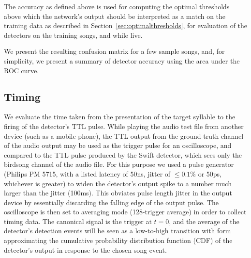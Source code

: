 \documentclass[10pt,letterpaper]{article}
\newcommand\argmin{\mathop{\mbox{{\rm argmin}}}\limits}
\newcommand{\noprint}[1]{}
\begin{document}
The accuracy as defined above is used for computing the optimal thresholds above
which the network's output should be interpreted as a match on the
training data as described in Section~\ref{sec:optimalthresholds}, for
evaluation of the detectors on the training songs,
and while live.

We present the resulting confusion matrix for a few sample songs, and, for simplicity, we present a summary of detector accuracy using the area under the ROC curve.

\noprint{
Since the network
will output values $o_t$ between 0 and 1 at each moment $t$ in an
attempt to match the training output, the optimal threshold
$\tau\in[0,1]$ for the output neuron should be computed.  Given the
relative cost of false positives vs.~false negatives $C$, and the
acceptable time difference between target syllable and correct output
$\Delta t_d$, we compute the optimal threshold for an output element
according to the definitions above:
\begin{eqnarray*}
  \mbox{true positives}_\tau &=& \mbox{size of set}_{s\in \mbox{target songs}} o_t > \tau, \left| t \leq \Delta t_d \right| \\
  \mbox{false negatives}_\tau &=& \mbox{size of set} {s\in\mbox{target songs}} - \mbox{size of set} \mbox{true positives} \\
  \mbox{false positives}_\tau &=& \mbox{size of set}_{s\in \mbox{target songs}} o_t > \tau, \left| t > \Delta t_d \right| \\
  \widehat{\tau} &=& \argmin_\tau C\mbox{false positive} + \mbox{false negatives}
\end{eqnarray*}
}

\subsection{Timing}

We evaluate the time taken from the presentation of the target
syllable to the firing of the detector's TTL pulse. While playing the
audio test file from another device (such as a mobile phone), the TTL
output from the ground-truth channel of the audio output may be used
as the trigger pulse for an oscilloscope, and compared to the TTL pulse
produced by the Swift detector, which sees only the birdsong channel
of the audio file. For this purpose we used a pulse
generator (Philips PM 5715, with a listed latency of 50ns, jitter 
of $\leq 0.1\%$ or 50ps, whichever is greater) to widen the
detector's output spike to a number much larger than the jitter (100ms).  This obviates pulse length jitter in the output device by essentially discarding the falling edge of the output pulse.  The oscilloscope is then set to
averaging mode (128-trigger average) in order to collect timing data. The canonical signal is the trigger at $t=0$, and the
average of the detector's detection events will be seen as a
low-to-high transition with form approximating the cumulative
probability distribution function (CDF) of the detector's output in
response to the chosen song event.
\end{document}
